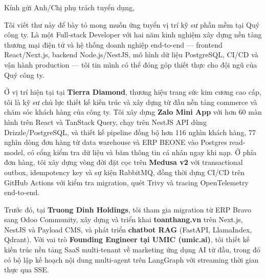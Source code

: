 \documentclass[10pt, letterpaper]{article}
\begin{document}
\pagestyle{empty}

\newcommand{\cvname}{TRƯƠNG VĨNH KHƯƠNG}


\vspace{0.5cm}

\begin{onecolentry}

Kính gửi Anh/Chị phụ trách tuyển dụng,

\vspace{0.2cm}

Tôi viết thư này để bày tỏ mong muốn ứng tuyển vị trí kỹ sư phần mềm tại Quý công ty. Là một Full-stack Developer với hai năm kinh nghiệm xây dựng nền tảng thương mại điện tử và hệ thống doanh nghiệp end-to-end --- frontend React/Next.js, backend Node.js/NestJS, mô hình dữ liệu PostgreSQL, CI/CD và vận hành production --- tôi tin mình có thể đóng góp thiết thực cho đội ngũ của Quý công ty.

\vspace{0.2cm}

Ở vị trí hiện tại tại \textbf{Tierra Diamond}, thương hiệu trang sức kim cương cao cấp, tôi là kỹ sư chủ lực thiết kế kiến trúc và xây dựng từ đầu nền tảng commerce và chăm sóc khách hàng của công ty. Tôi xây dựng \textbf{Zalo Mini App} với hơn 60 màn hình trên React và TanStack Query, chạy trên NestJS API dùng Drizzle/PostgreSQL, và thiết kế pipeline đồng bộ hơn 116 nghìn khách hàng, 77 nghìn dòng đơn hàng từ data warehouse và ERP BEONE vào Postgres read-model, có cổng kiểm tra dữ liệu và băm thông tin cá nhân ngay khi nạp. Ở phía đơn hàng, tôi xây dựng vòng đời đặt cọc trên \textbf{Medusa v2} với transactional outbox, idempotency key và sự kiện RabbitMQ, đồng thời dựng CI/CD trên GitHub Actions với kiểm tra migration, quét Trivy và tracing OpenTelemetry end-to-end.

\vspace{0.2cm}

Trước đó, tại \textbf{Truong Dinh Holdings}, tôi tham gia migration từ ERP Bravo sang Odoo Community, xây dựng và triển khai \textbf{toanthang.vn} trên Next.js, NestJS và Payload CMS, và phát triển \textbf{chatbot RAG} (FastAPI, LlamaIndex, Qdrant). Với vai trò \textbf{Founding Engineer tại UMIC (umic.ai)}, tôi thiết kế kiến trúc nền tảng SaaS multi-tenant về marketing ứng dụng AI từ đầu, trong đó có bộ lập kế hoạch nội dung multi-agent trên LangGraph với streaming thời gian thực qua SSE.

\vspace{0.2cm}


\end{onecolentry}
\end{document}
